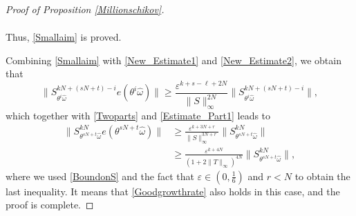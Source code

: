 \documentclass[10pt,a4paper]{amsart}
\newcommand{\eps}{\varepsilon}
\begin{document}
\begin{proof}[Proof of Proposition \ref{Millionschikov}]
\begin{itemize}
\begin{align*}
    \end{align*}
Thus, \eqref{Smallaim} is proved.
\end{itemize}
Combining \eqref{Smallaim} with \eqref{New_Estimate1} and \eqref{New_Estimate2}, we obtain that 
\[
\|S^{kN+(sN+t)-i}_{\theta^{i}\widehat\omega}e(\theta^{i}\widehat\omega)\|
\geq 
       \frac{\eps^{k+s-\ell+2N}}{\|S\|_{\infty}^{2N}} \|S^{kN+(sN+t)-i}_{\theta^{i}\widehat\omega}\|,
\]
which together with \eqref{Twoparts} and \eqref{Estimate_Part1} leads to
\begin{align*}
\|S^{kN}_{\theta^{sN+t}\widehat\omega}e(\theta^{sN+t}\widehat\omega)\|
& \geq \frac{\eps^{k+3N+r}}{\|S\|_{\infty}^{3N+r}}\|S^{kN}_{\theta^{sN+t}\widehat\omega}\|\\[1ex]
&\geq 
\frac{\eps^{k+4N}}{(1+2\|T\|_{\infty})^{4N}} \|S^{kN}_{\theta^{sN+t}\widehat\omega}\|,
\end{align*}
where we used \eqref{BoundonS} and the fact that $\eps\in (0,\frac{1}{6})$ and $r<N$ to obtain the last inequality. It means that \eqref{Goodgrowthrate} also holds in this case, and the proof is complete.
\end{proof}
\end{document}
